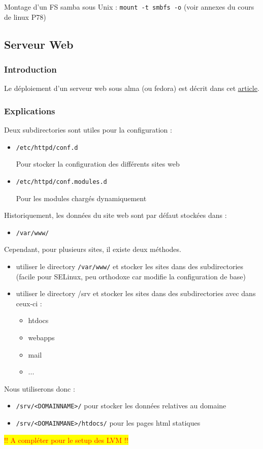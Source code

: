 \documentclass{article}
\begin{document}
	Montage d'un FS samba sous Unix :
	\texttt{mount -t smbfs -o} (voir annexes du cours de linux P78)
	
	\newpage
	
	
	
	
	
	
	
	
	
	
	\subsection{Serveur Web}
	\subsubsection{Introduction}
	Le déploiement d'un serveur web sous alma (ou fedora) est décrit dans cet \href{https://docs.fedoraproject.org/en-US/fedora-server/services/httpd-basic-setup/}{\underline{article}}.
	
	\subsubsection{Explications}	
		
	Deux subdirectories sont utiles pour la configuration :
	\begin{itemize}
		\item \texttt{/etc/httpd/conf.d}
		
		Pour stocker la configuration des différents sites web
		\item \texttt{/etc/httpd/conf.modules.d}
		
		Pour les modules chargés dynamiquement
	\end{itemize}
	Historiquement, les données du site web sont par défaut stockées dans :
	\begin{itemize}
		\item \texttt{/var/www/}
	\end{itemize}
	Cependant, pour plusieurs sites, il existe deux méthodes.
	\begin{itemize}
		\item utiliser  le directory \texttt{/var/www/} et stocker les sites dans des subdirectories (facile pour SELinux, peu orthodoxe car modifie la configuration de base)
		\item utiliser le directory /srv et stocker les sites dans des subdirectories avec dans ceux-ci :
		\begin{itemize}
			 \item htdocs
			 \item webapps
			 \item mail
			 \item ...
		\end{itemize}
	\end{itemize}
	Nous utiliserons donc :
	\begin{itemize}
		\item \texttt{/srv/<DOMAINNAME>/} pour stocker les données relatives au domaine
		\item  \texttt{/srv/<DOMAINMANE>/htdocs/} pour les pages html statiques
	\end{itemize}
	\colorbox{yellow}{\textcolor{red}{!! A compléter pour le setup des LVM !!}}
	
\end{document}
